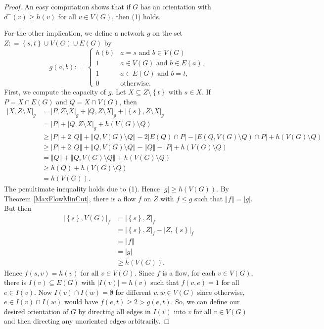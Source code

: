 \documentclass[openany]{tufte-book} %
\theoremstyle{plain}
\newcommand{\set}[1]{\left\{ #1 \right\}}
\newcommand{\card}[1]{\left|#1\right|}
\newcommand{\size}[1]{\left\Vert#1\right\Vert}
\newcommand{\parens}[1]{\left( #1 \right)}
\newcommand{\DefinedAs}{\mathrel{\mathop:}=}
\begin{document}
\begin{proof}
An easy computation shows that if $G$ has an orientation with $d^{-}(v)\ge h(v)$ for all $v\in V(G)$, then (1) holds.

For the other implication, we define a network $g$ on the set $Z \DefinedAs \set{s,t} \cup V(G) \cup E(G)$ by
\[g(a, b) \DefinedAs  \begin{cases} 
      h(b) & a = s \text{ and } b \in  V(G)\\
	  1 & a \in V(G) \text{ and } b \in E(a),\\
      1 & a \in E(G) \text{ and } b = t,\\
      0 & \text{otherwise} .
   \end{cases}
\]
First, we compute the capacity of $g$. Let $X \subseteq Z \setminus \set{t}$ with $s \in X$.  If $P = X \cap E(G)$ and $Q = X \cap V(G)$, then
\begin{align*}
\card{X, Z\setminus X}_g &= \card{P, Z\setminus X}_g + \card{Q, Z\setminus X}_g + \card{\set{s}, Z\setminus X}_g\\
&=\card{P} + \card{Q, Z\setminus X}_g + h\parens{V(G)\setminus Q}\\
&\ge\card{P} + 2\size{Q} + \size{Q, V(G)\setminus Q} - 2\card{E(Q) \cap P} - \card{E(Q, V(G)\setminus Q) \cap P} + h\parens{V(G)\setminus Q}\\
&\ge\card{P} + 2\size{Q} + \size{Q, V(G)\setminus Q} -\size{Q} - \card{P} + h\parens{V(G)\setminus Q}\\
&= \size{Q} + \size{Q, V(G)\setminus Q} + h\parens{V(G)\setminus Q}\\
&\ge h(Q) + h\parens{V(G)\setminus Q}\\
&= h(V(G)).
\end{align*}
The penultimate inequality holds due to (1).
Hence $\card{g} \ge h(V(G))$.  By Theorem \ref{MaxFlowMinCut}, there is a flow $f$ on $Z$ with $f \le g$ such that $\size{f} = \card{g}$.  But then
\begin{align*}
\card{\set{s}, V(G)}_f &=  \card{\set{s}, Z}_f \\
&= \card{\set{s}, Z}_f - \card{Z, \set{s}}_f\\
&=\size{f}\\
&= \card{g}\\
&\ge h(V(G)).
\end{align*}
Hence $f(s,v) = h(v)$ for all $v \in V(G)$.  Since $f$ is a flow, for each $v \in V(G)$, there is $I(v) \subseteq E(G)$ with $\card{I(v)} = h(v)$ such that $f(v, e) = 1$ for all $e \in I(v)$.
Now $I(v) \cap I(w) = \emptyset$ for different $v,w \in V(G)$ since otherwise, $e \in I(v) \cap I(w)$ would have $f(e, t) \ge 2 > g(e, t)$.  So, we can define our desired orientation of $G$
by directing all edges in $I(v)$ into $v$ for all $v \in V(G)$ and then directing any unoriented edges arbitrarily. 
\end{proof}
\end{document}
